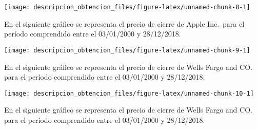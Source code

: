 \documentclass[]{article}
\newenvironment{Shaded}{\begin{snugshade}}{\end{snugshade}}
\newcommand{\DataTypeTok}[1]{\textcolor[rgb]{0.13,0.29,0.53}{#1}}
\newcommand{\KeywordTok}[1]{\textcolor[rgb]{0.13,0.29,0.53}{\textbf{#1}}}
\newcommand{\NormalTok}[1]{#1}
\newcommand{\OperatorTok}[1]{\textcolor[rgb]{0.81,0.36,0.00}{\textbf{#1}}}
\newcommand{\StringTok}[1]{\textcolor[rgb]{0.31,0.60,0.02}{#1}}
\begin{document}
\begin{center}\texttt{[image: descripcion\_obtencion\_files/figure-latex/unnamed-chunk-8-1]} \end{center}

\setlength\parskip{5ex}
\justifying

En el siguiente gráfico se representa el precio de cierre de Apple
Inc.~para el período comprendido entre el 03/01/2000 y 28/12/2018.

\begin{Shaded}
\end{Shaded}

\begin{center}\texttt{[image: descripcion\_obtencion\_files/figure-latex/unnamed-chunk-9-1]} \end{center}

\setlength\parskip{5ex}
\justifying

En el siguiente gráfico se representa el precio de cierre de Wells Fargo
and CO. para el período comprendido entre el 03/01/2000 y 28/12/2018.

\begin{Shaded}
\end{Shaded}

\begin{center}\texttt{[image: descripcion\_obtencion\_files/figure-latex/unnamed-chunk-10-1]} \end{center}
\centering

\setlength\parskip{5ex}
\justifying

En el siguiente gráfico se representa el precio de cierre de Wells Fargo
and CO. para el período comprendido entre el 03/01/2000 y 28/12/2018.
\end{document}
